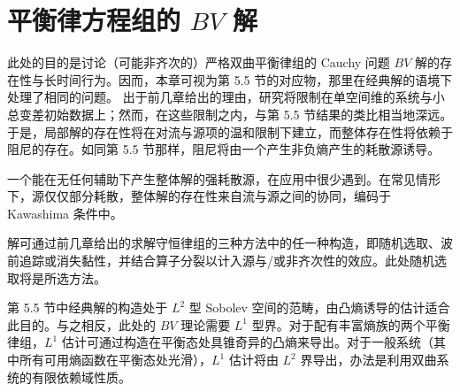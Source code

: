 \documentclass[../main.tex]{subfiles}
\begin{document}
\chapter{平衡律方程组的 $BV$ 解}\label{chapter:ch16-平衡律组bv解}

此处的目的是讨论（可能非齐次的）严格双曲平衡律组的 Cauchy 问题 $BV$ 解的存在性与长时间行为。因而，本章可视为第 5.5 节的对应物，那里在经典解的语境下处理了相同的问题。
出于前几章给出的理由，研究将限制在单空间维的系统与小总变差初始数据上；然而，在这些限制之内，与第 5.5 节结果的类比相当地深远。于是，局部解的存在性将在对流与源项的温和限制下建立，而整体存在性将依赖于阻尼的存在。如同第 5.5 节那样，阻尼将由一个产生非负熵产生的耗散源诱导。

一个能在无任何辅助下产生整体解的强耗散源，在应用中很少遇到。在常见情形下，源仅仅部分耗散，整体解的存在性来自流与源之间的协同，编码于 Kawashima 条件中。

解可通过前几章给出的求解守恒律组的三种方法中的任一种构造，即随机选取、波前追踪或消失黏性，并结合算子分裂以计入源与/或非齐次性的效应。此处随机选取将是所选方法。

第 5.5 节中经典解的构造处于 $L^2$ 型 Sobolev 空间的范畴，由凸熵诱导的估计适合此目的。与之相反，此处的 $BV$ 理论需要 $L^1$ 型界。对于配有丰富熵族的两个平衡律组，$L^1$ 估计可通过构造在平衡态处具锥奇异的凸熵来导出。对于一般系统（其中所有可用熵函数在平衡态处光滑），$L^1$ 估计将由 $L^2$ 界导出，办法是利用双曲系统的有限依赖域性质。








\end{document}
